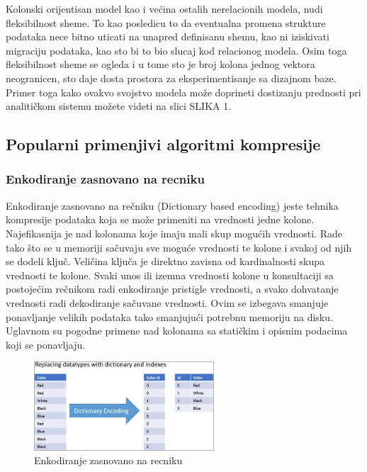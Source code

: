 \documentclass[12pt,oneside]{memoir}
\begin{document}
Kolonski orijentisan model kao i većina ostalih nerelacionih modela, nudi fleksibilnost sheme. To kao posledicu to da eventualna promena strukture podataka nece bitno uticati na unapred definisanu shemu, kao ni iziskivati migraciju podataka, kao sto bi to bio slucaj kod relacionog modela. Osim toga fleksibilnost sheme se ogleda i u tome sto je broj kolona jednog vektora neogranicen, sto daje dosta prostora za eksperimentisanje sa dizajnom baze. Primer toga kako ovakvo svojstvo modela može doprineti dostizanju prednosti pri analitičkom sistemu možete videti na slici SLIKA 1. 

\subsection{Popularni primenjivi algoritmi kompresije}
\cite{ColumnarOptimizations}
\subsubsection{Enkodiranje zasnovano na recniku}

Enkodiranje zasnovano na rečniku (Dictionary based encoding) jeste tehnika kompresije podataka koja se može primeniti na vrednosti jedne kolone. Najefikasnija je nad kolonama koje imaju mali skup mogućih vrednosti. Rade tako što se u memoriji sačuvaju sve moguće vrednosti te kolone i svakoj od njih se dodeli ključ. Veličina ključa je direktno zavisna od kardinalnosti skupa vrednosti te kolone. Svaki unos ili izemna vrednosti kolone u konsultaciji sa postojećim rečnikom radi enkodiranje pristigle vrednosti, a svako dohvatanje vrednosti radi dekodiranje sačuvane vrednosti. Ovim se izbegava smanjuje ponavljanje velikih podataka tako smanjujući potrebnu memoriju na disku. Uglavnom su pogodne primene nad kolonama sa statičkim i opisnim podacima koji se ponavljaju.
\begin{figure}[!ht]
  \centering
  \includegraphics[width=0.6\textwidth]{DictionaryEncoding.jpg}
  \caption{Enkodiranje zasnovano na recniku}
  \label{fig:grafikon}
\end{figure}
\end{document}
